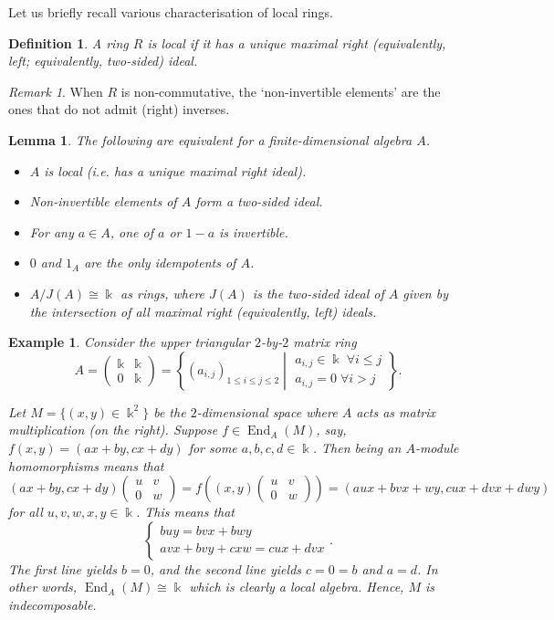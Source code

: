 \documentclass[11pt,a4paper]{article}
\numberwithin{equation}{section}
\theoremstyle{all}
\newtheorem{lemma}[theorem]{Lemma}
\newtheorem{example}[theorem]{Example}
\newtheorem{definition}[theorem]{Definition}
\theoremstyle{remark}
\newtheorem{remark}[theorem]{Remark}
\newcommand{\End}{\operatorname{End}\nolimits}
\newcommand{\defn}[1]{\textsl{\color{darkblue} #1}}
\begin{document}
Let us briefly recall various characterisation of local rings.

\begin{definition}
A ring $R$ is \defn{local} if it has a unique maximal right (equivalently, left; equivalently, two-sided) ideal.
\end{definition}
\begin{remark}
When $R$ is non-commutative, the `non-invertible elements' are the ones that do not admit (right) inverses.
\end{remark}

\begin{lemma}
The following are equivalent for a finite-dimensional algebra $A$.
\begin{itemize}
\item $A$ is local (i.e. has a unique maximal right ideal).
\item Non-invertible elements of $A$ form a two-sided ideal.
\item For any $a\in A$, one of $a$ or $1-a$ is invertible.
\item $0$ and $1_A$ are the only idempotents of $A$. 
\item $A/J(A)\cong \Bbbk$ as rings, where $J(A)$ is the two-sided ideal of $A$ given by the intersection of all maximal right (equivalently, left) ideals.
\end{itemize} 
\end{lemma}

\begin{example}\label{eg:A2 first}
Consider the upper triangular $2$-by-$2$ matrix ring
\[
A=\begin{pmatrix}
\Bbbk & \Bbbk  \\
0 & \Bbbk  
\end{pmatrix} = { \left\{(a_{i,j})_{1\leq i\leq j\leq 2}\middle| \begin{array}{l}a_{i,j}\in \Bbbk \;\forall i\leq j\\
a_{i,j}=0\;\forall i>j \end{array}\right\} }.
\]

Let $M =\{(x,y)\in \Bbbk^2\}$ be the $2$-dimensional space where $A$ acts as matrix multiplication (on the right).
Suppose $f\in\End_A(M)$, say, $f(x,y)=(ax+by,cx+dy)$ for some $a,b,c,d\in\Bbbk$.
Then being an $A$-module homomorphisms means that
\[
(ax+by,cx+dy)\begin{pmatrix}u & v \\ 0& w\end{pmatrix} = f\left((x,y)\begin{pmatrix}u & v \\ 0& w\end{pmatrix}\right) = (aux+bvx+wy,cux+dvx+dwy)
\]
for all $u,v,w,x,y\in\Bbbk$.
This means that 
\[
\begin{cases}
buy=bvx+bwy \\
avx+bvy+cxw=cux+dvx 
\end{cases}.
\]
The first line yields $b=0$, and the second line yields $c=0=b$ and $a=d$.
In other words, $\End_A(M)\cong \Bbbk$ which is clearly a local algebra.  Hence, $M$ is indecomposable.
\end{example}
\end{document}
